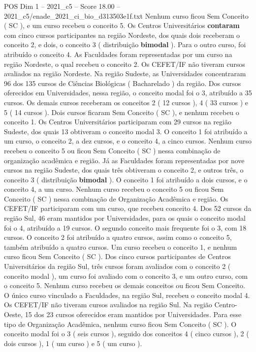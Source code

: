 \begin{textsample}{POS Dim 1 – 2021\_c5 – Score 18.00 – 2021\_c5/enade\_2021\_ci\_bio\_d313503e1f.txt}
Nenhum curso ficou Sem Conceito ( SC ), e um curso recebeu o conceito 5.
Os Centros Universitários \textbf{contaram} com cinco cursos participantes na região Nordeste, dos quais dois receberam o conceito 2, e dois, o conceito 3 ( distribuição \textbf{bimodal} ).
Para o outro curso, foi atribuído o conceito 4.
As Faculdades foram representadas por um curso na região Nordeste, o qual recebeu o conceito 2.
Os CEFET/IF não tiveram cursos avaliados na região Nordeste.
Na região Sudeste, as Universidades concentraram 96 dos 135 cursos de Ciências Biológicas ( Bacharelado ) da região.
Dos cursos oferecidos em Universidades, nessa região, o conceito modal foi o 3, atribuído a 35 cursos.
Os demais cursos receberam os conceitos 2 ( 12 cursos ), 4 ( 33 cursos ) e 5 ( 14 cursos ).
Dois cursos ficaram Sem Conceito ( SC ), e nenhum recebeu o conceito 1.
Os Centros Universitários participaram com 29 cursos na região Sudeste, dos quais 13 obtiveram o conceito modal 3.
O conceito 1 foi atribuído a um curso, o conceito 2, a dez cursos, e o conceito 4, a cinco cursos.
Nenhum curso recebeu o conceito 5 ou ficou Sem Conceito ( SC ) nessa combinação de organização acadêmica e região.
Já as Faculdades foram representadas por nove cursos na região Sudeste, dos quais três obtiveram o conceito 2, e outros três, o conceito 3 ( distribuição \textbf{bimodal} ).
O conceito 1 foi atribuído a dois cursos, e o conceito 4, a um curso.
Nenhum curso recebeu o conceito 5 ou ficou Sem Conceito ( SC ) nessa combinação de Organização Acadêmica e região.
Os CEFET/IF participaram com um curso, que recebeu conceito 4.
Dos 52 cursos da região Sul, 46 eram mantidos por Universidades, para os quais o conceito modal foi o 4, atribuído a 19 cursos.
O segundo conceito mais frequente foi o 3, com 18 cursos.
O conceito 2 foi atribuído a quatro cursos, assim como o conceito 5, também atribuído a quatro cursos.
Um curso recebeu o conceito 1, e nenhum curso ficou Sem Conceito ( SC ).
Dos cinco cursos participantes de Centros Universitários da região Sul, três cursos foram avaliados com o conceito 2 ( conceito modal ), um curso foi avaliado com o conceito 3, e um outro curso, com o conceito 5.
Nenhum curso recebeu os demais conceitos ou ficou Sem Conceito.
O único curso vinculado a Faculdades, na região Sul, recebeu o conceito modal 4.
Os CEFET/IF não tiveram cursos avaliados na região Sul.
Na região Centro-Oeste, 15 dos 23 cursos oferecidos eram mantidos por Universidades.
Para esse tipo de Organização Acadêmica, nenhum curso ficou Sem Conceito ( SC ).
O conceito modal foi o 3 ( seis cursos ), seguido dos conceitos 4 ( cinco cursos ), 2 ( dois cursos ), 1 ( um curso ) e 5 ( um curso ).

\end{textsample}
